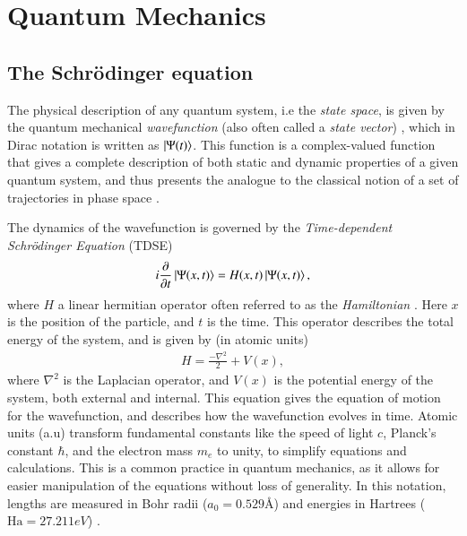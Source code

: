 \documentclass{subfiles}
\begin{document}
\section{Quantum Mechanics}
\subsection{The Schrödinger equation}
The physical description of any quantum system, i.e the \emph{state space}, is given by the quantum mechanical \emph{wavefunction} (also often called a \emph{state vector}) \cite{nielsen2010quantum}, which in Dirac notation is written as $\ket{\Psi(t)}$. 
This function is a complex-valued function that gives a complete description of both static and dynamic properties of a given quantum system, and thus presents the analogue to the classical notion of a set of trajectories in phase space \cite{hochstuhl2014time}. 

The dynamics of the wavefunction is governed by the \emph{Time-dependent Schrödinger Equation} (TDSE)
\begin{equation}
    i\frac{\partial}{\partial t}\ket{\Psi(x, t)} = H(x,t)\ket{\Psi(x, t)}\label{eq:tdse},
\end{equation}
where $H$ a linear hermitian operator often referred to as the \emph{Hamiltonian} \cite{griffiths2018introduction, berera2021quantum}. Here $x$ is the position of the particle, and $t$ is the time. 
This operator describes the total energy of the system, and is given by (in atomic units)
\begin{align*}
    H = \frac{-\nabla^2}{2} + V(x),
\end{align*}
where $\nabla^2$ is the Laplacian operator, and $V(x)$ is the potential energy of the system, both external and internal.
This equation gives the equation of motion for the wavefunction, and describes how the wavefunction evolves in time. Atomic units (a.u) transform fundamental constants like the speed of light $c$, Planck's constant $\hbar$, and the electron mass $m_e$ to unity, to simplify equations and calculations. This is a common practice in quantum mechanics, as it allows for easier manipulation of the equations without loss of generality. In this notation, lengths are measured in Bohr radii ($ a_0 = 0.529Å$) and energies in Hartrees ($ \text{Ha} = 27.211 eV$) \cite{szabo1996modern}.
\end{document}

